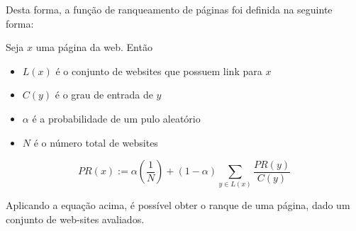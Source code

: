 Desta forma, a função de ranqueamento de páginas foi definida na seguinte forma:

Seja $x$ uma página da web. Então
\begin{itemize}
    \item $L(x)$ é o conjunto de websites que possuem link para $x$
    \item $C(y)$ é o grau de entrada de $y$
    \item $\alpha$ é a probabilidade de um pulo aleatório
    \item $N$ é o número total de websites
\end{itemize}
\[\displaystyle PR(x) := \alpha \left ( \frac{1}{N} \right ) + (1-\alpha) \sum_{y\in L(x)} \frac{PR(y)}{C(y)}\]

Aplicando a equação acima, é possível obter o ranque de uma página, dado um conjunto
de web-sites avaliados.
